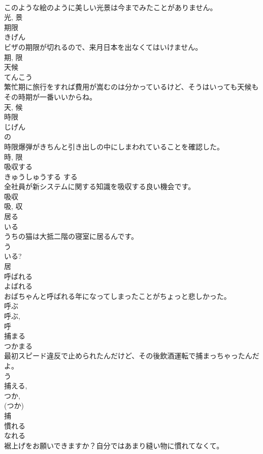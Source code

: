 \documentclass[8pt]{extreport}
\begin{document}
\begin{CJK}{UTF8}{min}
\\	このような絵のように美しい光景は今までみたことがありません。	
\\	光, 景	
\\	期限	
\\	きげん	
\\	ビザの期限が切れるので、来月日本を出なくてはいけません。	
\\	期, 限	
\\	天候	
\\	てんこう	
\\	繁忙期に旅行をすれば費用が嵩むのは分かっているけど、そうはいっても天候もその時期が一番いいからね。	
\\	天, 候	
\\	時限	
\\	じげん	
\\	の 
\\	時限爆弾がきちんと引き出しの中にしまわれていることを確認した。	
\\	時, 限	
\\	吸収する	
\\	きゅうしゅうする	する 
\\	全社員が新システムに関する知識を吸収する良い機会です。	
\\	吸収 
\\	吸, 収	
\\	居る	
\\	いる	
\\	うちの猫は大抵二階の寝室に居るんです。	
\\	う 
\\	いる? 
\\	居	
\\	呼ばれる	
\\	よばれる	
\\	おばちゃんと呼ばれる年になってしまったことがちょっと悲しかった。	
\\	呼ぶ 
\\	呼ぶ, 
\\	呼	
\\	捕まる	
\\	つかまる	
\\	最初スピード違反で止められたんだけど、その後飲酒運転で捕まっちゃったんだよ。	
\\	う 
\\	捕える, 
\\	つか, 
\\	(つか) 
\\	捕	
\\	慣れる	
\\	なれる	
\\	裾上げをお願いできますか？自分ではあまり縫い物に慣れてなくて。	

\end{CJK}
\end{document}
